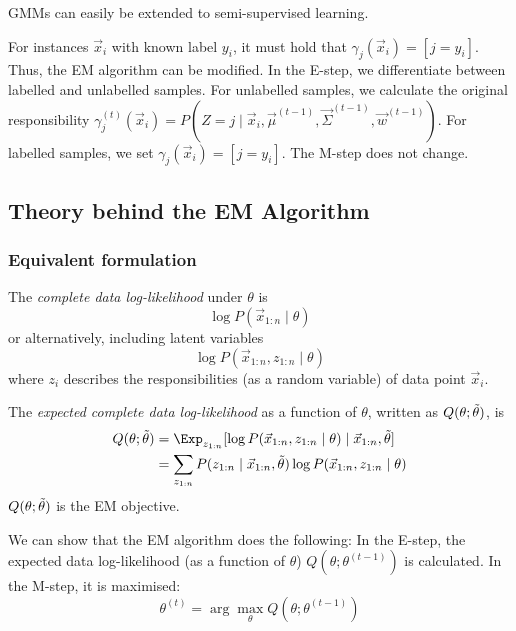 GMMs can easily be extended to
semi-supervised learning.

For instances $\vec{x}_i$ with known
label $y_i$, it must hold that
$\gamma_j(\vec{x}_i) = [j = y_i]$.
Thus, the EM algorithm can be modified.
In the E-step, we differentiate between
labelled and unlabelled samples.
For unlabelled samples,
we calculate the original responsibility
$\gamma_j^{(t)}(\vec{x}_i) = P(Z = j \mid \vec{x}_i, \vec{\mu}^{(t - 1)}, \vec{\Sigma}^{(t - 1)}, \vec{w}^{(t - 1)})$.
For labelled samples, we set $\gamma_j(\vec{x}_i) = [j = y_i]$.
The M-step does not change.


\subsection{Theory behind the EM Algorithm}
\subsubsection{Equivalent formulation}
The \emph{complete data log-likelihood} under $\theta$ is
\begin{equation*}
    \log{P(\vec{x}_{1:n} \mid \theta)}
\end{equation*}
or alternatively, including latent variables
\begin{equation*}
    \log{P(\vec{x}_{1:n}, z_{1:n} \mid \theta)}
\end{equation*}
where $z_i$ describes the responsibilities
(as a random variable)
of data point $\vec{x}_i$.

The \emph{expected complete data log-likelihood}
as a function of $\theta$,
written as $Q(\theta; \Tilde{\theta})$, is
\begin{align*}
    Q(\theta; \Tilde{\theta}) &=
    \Exp_{z_{1:n}}[
        \log{P(\vec{x}_{1:n}, z_{1:n} \mid \theta)} \mid \vec{x}_{1:n}, \Tilde{\theta}
    ] \\
    &= \sum_{z_{1:n}}{
        P(z_{1:n} \mid \vec{x}_{1:n}, \Tilde{\theta}) \log{P(\vec{x}_{1:n}, z_{1:n} \mid \theta)}
    }
\end{align*}
$Q(\theta; \Tilde{\theta})$ is the EM objective.

We can show that the EM algorithm does the following:
In the E-step, the expected data log-likelihood
(as a function of $\theta$) $Q(\theta; \theta^{(t-1)})$
is calculated.
In the M-step, it is maximised:
\begin{equation*}
    \theta^{(t)} = \arg\max_\theta{Q(\theta; \theta^{(t-1)})}
\end{equation*}

